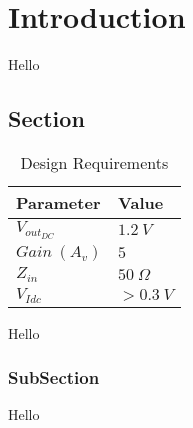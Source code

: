\chapter{Introduction}
\thispagestyle{empty}
Hello \cite{borkar2011future}
\section{Section}

\begin{table}[H]
    \centering
    \caption{Design Requirements}
    \label{tab:Q2_designReqs}
    \begin{tabular}{L{4.5cm} L{4cm}}
        \toprule
        Parameter & Value \\
        \midrule
        \(V_{out_{DC}}\) & \(1.2\ V\) \\
        \(Gain\ (A_v)\) & \(5\) \\
        \(Z_{in}\) & \(50\ \Omega\) \\
        \(V_{Idc}\) & \(> 0.3\ V\) \\
        \bottomrule
    \end{tabular}
\end{table}

Hello
\subsection{SubSection}
Hello